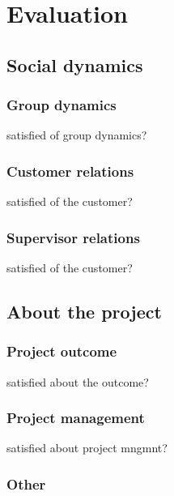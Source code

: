\chapter{Evaluation} 
\label{ch:reflection}


\section{Social dynamics}
\subsection{Group dynamics}
satisfied of group dynamics?
\subsection{Customer relations}
satisfied of the customer?
\subsection{Supervisor relations}
satisfied of the customer?
\section{About the project}

\subsection{Project outcome}
satisfied about the outcome?
\subsection{Project management}
satisfied about project mngmnt?
\subsection{Other}
